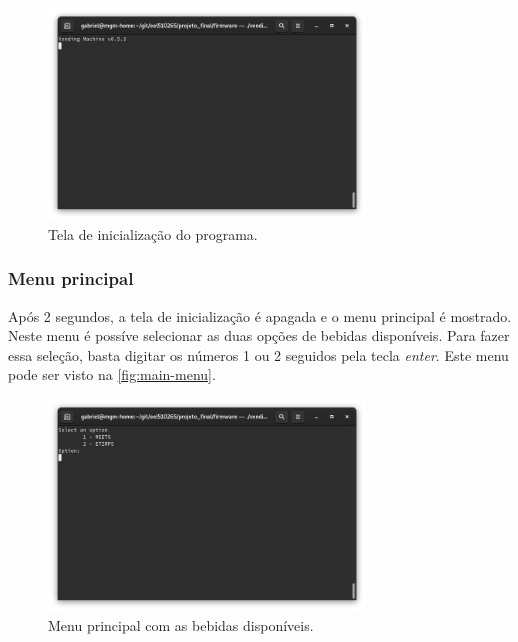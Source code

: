 \begin{figure}[!ht]
    \begin{center}
        \includegraphics[width=0.75\textwidth]{figures/splash-screen.png}
        \caption{Tela de inicialização do programa.}
        \label{fig:splash-screen}
    \end{center}
\end{figure}

\subsubsection{Menu principal}

Após 2 segundos, a tela de inicialização é apagada e o menu principal é mostrado. Neste menu é possíve selecionar as duas opções de bebidas disponíveis. Para fazer essa seleção, basta digitar os números 1 ou 2 seguidos pela tecla \textit{enter}. Este menu pode ser visto na \autoref{fig:main-menu}.

\begin{figure}[!ht]
    \begin{center}
        \includegraphics[width=0.75\textwidth]{figures/main-menu.png}
        \caption{Menu principal com as bebidas disponíveis.}
        \label{fig:main-menu}
    \end{center}
\end{figure}

